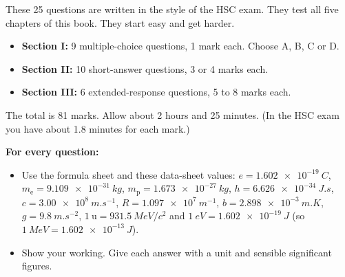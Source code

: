 \providecommand\pracmarks[1]{\hfill\mbox{\textcolor{hscmuted}{\small(#1)}}}
\providecommand\pracblank{\textcolor{hscmuted}{\rule[-2pt]{2.2em}{0.4pt}}}
\providecommand\pracNuc[3]{\ensuremath{\mathord{%
  \setbox0=\hbox{$\scriptstyle#1$}\setbox2=\hbox{$\scriptstyle#2$}%
  \ifdim\wd0<\wd2 \setbox0=\hbox to\wd2{\hss\box0}\else\setbox2=\hbox to\wd0{\hss\box2}\fi
  {}^{\box0}_{\box2}\mathrm{#3}}}}
\providecommand\pracaq[1]{\ensuremath{\overline{\mathrm{#1}}}}


These 25 questions are written in the style of the HSC exam. They test all five chapters of
this book. They start easy and get harder.
\begin{itemize}
  \item \textbf{Section I:} 9 multiple-choice questions, 1 mark each. Choose A, B, C or D.
  \item \textbf{Section II:} 10 short-answer questions, 3 or 4 marks each.
  \item \textbf{Section III:} 6 extended-response questions, 5 to 8 marks each.
\end{itemize}
The total is 81 marks. Allow about 2 hours and 25 minutes. (In the HSC exam you have about
1.8 minutes for each mark.)

\textbf{For every question:}
\begin{itemize}
  \item Use the formula sheet and these data-sheet values: $e = \qty{1.602e-19}{C}$,
        $m_\mathrm{e} = \qty{9.109e-31}{kg}$, $m_\mathrm{p} = \qty{1.673e-27}{kg}$,
        $h = \qty{6.626e-34}{J.s}$, $c = \qty{3.00e8}{m.s^{-1}}$,
        $R = \qty{1.097e7}{m^{-1}}$, $b = \qty{2.898e-3}{m.K}$, $g = \qty{9.8}{m.s^{-2}}$,
        $\qty{1}{\amu} = \qty{931.5}{MeV}/c^2$ and $\qty{1}{eV} = \qty{1.602e-19}{J}$
        (so $\qty{1}{MeV} = \qty{1.602e-13}{J}$).
  \item Show your working. Give each answer with a unit and sensible significant figures.
\end{itemize}

